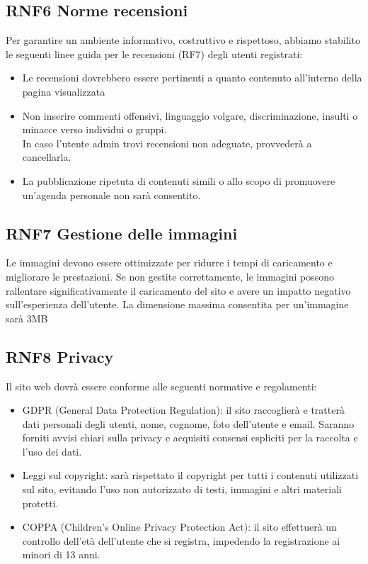\documentclass[a4paper,12pt]{article}
\begin{document}
\subsection*{RNF6 Norme recensioni}
Per garantire un ambiente informativo, costruttivo e rispettoso, abbiamo stabilito le seguenti linee guida per le recensioni (RF7) degli utenti registrati:
\begin{itemize}
    \item Le recensioni dovrebbero essere pertinenti a quanto contenuto all'interno della pagina visualizzata
    \item Non inserire commenti offensivi, linguaggio volgare, discriminazione, insulti o minacce verso individui o gruppi.\\
    In caso l'utente admin trovi recensioni non adeguate, provvederà a cancellarla.
    \item La pubblicazione ripetuta di contenuti simili o allo scopo di promuovere un'agenda personale non sarà consentito.
\end{itemize}

\subsection*{RNF7 Gestione delle immagini}
Le immagini devono essere ottimizzate per ridurre i tempi di caricamento e migliorare le prestazioni. Se non gestite correttamente, le immagini possono rallentare significativamente il caricamento del sito e avere un impatto negativo sull'esperienza dell'utente.
La dimensione massima consentita per un'immagine sarà 3MB


\subsection*{RNF8 Privacy}
Il sito web dovrà essere conforme alle seguenti normative e regolamenti:
\begin{itemize}
    \item GDPR (General Data Protection Regulation): il sito raccoglierà e tratterà dati personali degli utenti, nome, cognome, foto dell'utente e email. Saranno forniti avvisi chiari sulla privacy e acquisiti consensi espliciti per la raccolta e l'uso dei dati.
    \item Leggi sul copyright: sarà rispettato il copyright per tutti i contenuti utilizzati sul sito, evitando l'uso non autorizzato di testi, immagini e altri materiali protetti.
    \item COPPA (Children's Online Privacy Protection Act): il sito effettuerà un controllo dell'età dell'utente che si registra, impedendo la registrazione ai minori di 13 anni.
\end{itemize}
\end{document}
